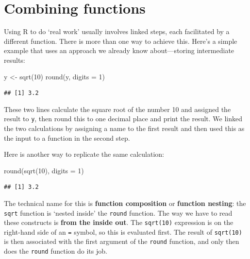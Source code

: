 \documentclass[
]{book}
\newenvironment{Shaded}{\begin{snugshade}}{\end{snugshade}}
\newcommand{\AttributeTok}[1]{\textcolor[rgb]{0.77,0.63,0.00}{#1}}
\newcommand{\DecValTok}[1]{\textcolor[rgb]{0.00,0.00,0.81}{#1}}
\newcommand{\FunctionTok}[1]{\textcolor[rgb]{0.00,0.00,0.00}{#1}}
\newcommand{\NormalTok}[1]{#1}
\newcommand{\OtherTok}[1]{\textcolor[rgb]{0.56,0.35,0.01}{#1}}
\begin{document}
\hypertarget{combining-functions}{%
\section{Combining functions}\label{combining-functions}}

Using R to do `real work' usually involves linked steps, each facilitated by a different function. There is more than one way to achieve this. Here's a simple example that uses an approach we already know about---storing intermediate results:

\begin{Shaded}
\begin{Highlighting}[]
\NormalTok{y }\OtherTok{\textless{}{-}} \FunctionTok{sqrt}\NormalTok{(}\DecValTok{10}\NormalTok{)}
\FunctionTok{round}\NormalTok{(y, }\AttributeTok{digits =} \DecValTok{1}\NormalTok{)}
\end{Highlighting}
\end{Shaded}

\begin{verbatim}
## [1] 3.2
\end{verbatim}

These two lines calculate the square root of the number 10 and assigned the result to \texttt{y}, then round this to one decimal place and print the result. We linked the two calculations by assigning a name to the first result and then used this as the input to a function in the second step.

Here is another way to replicate the same calculation:

\begin{Shaded}
\begin{Highlighting}[]
\FunctionTok{round}\NormalTok{(}\FunctionTok{sqrt}\NormalTok{(}\DecValTok{10}\NormalTok{), }\AttributeTok{digits =} \DecValTok{1}\NormalTok{)}
\end{Highlighting}
\end{Shaded}

\begin{verbatim}
## [1] 3.2
\end{verbatim}

The technical name for this is \textbf{function composition} or \textbf{function nesting}: the \texttt{sqrt} function is `nested inside' the \texttt{round} function. The way we have to read these constructs is \textbf{from the inside out}. The \texttt{sqrt(10)} expression is on the right-hand side of an \texttt{=} symbol, so this is evaluated first. The result of \texttt{sqrt(10)} is then associated with the first argument of the \texttt{round} function, and only then does the \texttt{round} function do its job.
\end{document}
